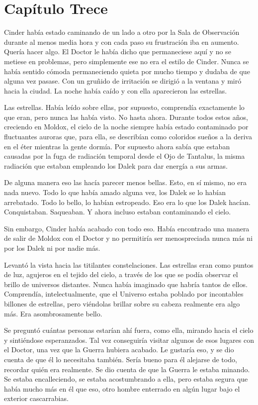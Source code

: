 \chapter*{Capítulo Trece}




Cinder había estado caminando de un lado a otro por la Sala de Observación durante al menos media hora y con cada paso su frustración iba en aumento. Quería hacer algo. El Doctor le había dicho que permaneciese aquí y no se metiese en problemas, pero simplemente ese no era el estilo de Cinder. Nunca se había sentido cómoda permaneciendo quieta por mucho tiempo y dudaba de que alguna vez pasase. Con un gruñido de irritación se dirigió a la ventana y miró hacia la ciudad. La noche había caído y con ella aparecieron las estrellas. 

Las estrellas. Había leído sobre ellas, por supuesto, comprendía exactamente lo que eran, pero nunca las había visto. No hasta ahora. Durante todos estos años, creciendo en Moldox, el cielo de la noche siempre había estado contaminado por fluctuantes auroras que, para ella, se describían como coloridos sueños a la deriva en el éter mientras la gente dormía. Por supuesto ahora sabía que estaban causadas por la fuga de radiación temporal desde el Ojo de Tantalus, la misma radiación que estaban empleando los Dalek para dar energía a sus armas. 

De alguna manera eso las hacía parecer menos bellas. Esto, en sí mismo, no era nada nuevo. Todo lo que había amado alguna vez, los Dalek se lo habían arrebatado. Todo lo bello, lo habían estropeado. Eso era lo que los Dalek hacían. Conquistaban. Saqueaban. Y ahora incluso estaban contaminando el cielo. 

Sin embargo, Cinder había acabado con todo eso. Había encontrado una manera de salir de Moldox con el Doctor y no permitiría ser menospreciada nunca más ni por los Dalek ni por nadie más. 

Levantó la vista hacia las titilantes constelaciones. Las estrellas eran como puntos de luz, agujeros en el tejido del cielo, a través de los que se podía observar el brillo de universos distantes. Nunca había imaginado que habría tantos de ellos. Comprendía, intelectualmente, que el Universo estaba poblado por incontables billones de estrellas, pero viéndolas brillar sobre su cabeza realmente era algo más. Era asombrosamente bello. 

Se preguntó cuántas personas estarían ahí fuera, como ella, mirando hacia el cielo y sintiéndose esperanzados. Tal vez conseguiría visitar algunos de esos lugares con el Doctor, una vez que la Guerra hubiera acabado. Le gustaría eso, y se dio cuenta de que él lo necesitaba también. Sería bueno para él alejarse de todo, recordar quién era realmente. Se dio cuenta de que la Guerra le estaba minando. Se estaba encalleciendo, se estaba acostumbrando a ella, pero estaba segura que había mucho más en él que eso, otro hombre enterrado en algún lugar bajo el exterior cascarrabias. 

